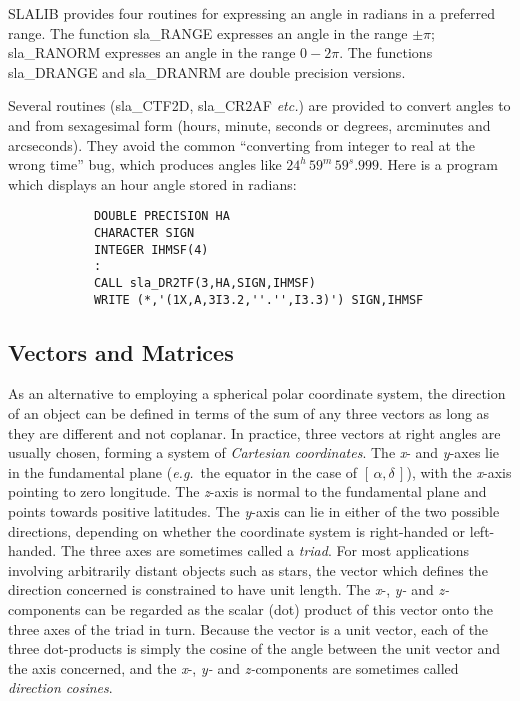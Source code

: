 \documentclass[11pt,twoside]{article}
\newcommand{\radec}     {$[\,\alpha,\delta\,]$}
\newcommand{\tseci}[1]   {$#1$\mbox{$^{\rm s}$}}
\newcommand{\tsec}[2]    {\tseci{#1}$\hspace{-0.3em}.#2$}
\renewcommand{\tsec}[2] {$#1^{\rm s}\hspace{-0.3em}.#2$}
\newcommand{\hms}[4]    {$#1^{\rm h}\,#2^{\rm m}\,$\tsec{#3}{#4}}
\renewcommand{\hms}[4] {$#1^{h}\,#2^{m}\,#3^{s}.#4$}
\begin{document}
SLALIB provides four routines for expressing an angle in radians
in a preferred range.  The function
sla\_RANGE
expresses an angle
in the range $\pm\pi$;
sla\_RANORM
expresses an angle in the range
$0-2\pi$.  The functions
sla\_DRANGE
and
sla\_DRANRM
are double precision versions.

Several routines
(sla\_CTF2D,
sla\_CR2AF
{\it etc.}) are provided to convert
angles to and from
sexagesimal form (hours, minute, seconds or degrees,
arcminutes and arcseconds).
They avoid the common
``converting from integer to real at the wrong time''
bug, which produces angles like \hms{24}{59}{59}{999}.
Here is a program which displays an hour angle
stored in radians:
\goodbreak
\begin{verbatim}
            DOUBLE PRECISION HA
            CHARACTER SIGN
            INTEGER IHMSF(4)
            :
            CALL sla_DR2TF(3,HA,SIGN,IHMSF)
            WRITE (*,'(1X,A,3I3.2,''.'',I3.3)') SIGN,IHMSF
\end{verbatim}
\goodbreak

\subsection {Vectors and Matrices}
As an alternative to employing a spherical polar coordinate system,
the direction of an object can be defined in terms of the sum of any
three vectors as long as they are different and
not coplanar.  In practice, three vectors at right angles are
usually chosen, forming a system
of {\it Cartesian coordinates}.  The {\it x}- and {\it y}-axes
lie in the fundamental plane ({\it e.g.}\ the equator in the
case of \radec), with the {\it x}-axis pointing to zero longitude.
The {\it z}-axis is normal to the fundamental plane and points
towards positive latitudes.  The {\it y}-axis can lie in either
of the two possible directions, depending on whether the
coordinate system is right-handed or left-handed.
The three axes are sometimes called
a {\it triad}.  For most applications involving arbitrarily
distant objects such as stars, the vector which defines
the direction concerned is constrained to have unit length.
The {\it x}-, {\it y-} and {\it z-}components
can be regarded as the scalar (dot) product of this vector
onto the three axes of the triad in turn.  Because the vector
is a unit vector,
each of the three dot-products is simply the cosine of the angle
between the unit vector and the axis concerned, and the
{\it x}-, {\it y-} and {\it z-}components are sometimes
called {\it direction cosines}.
\end{document}
